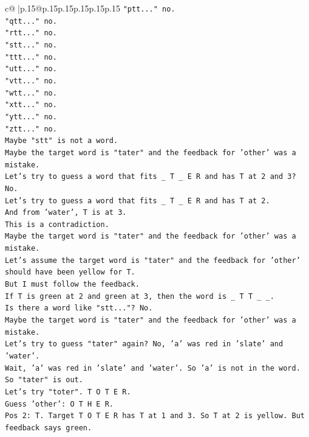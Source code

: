 \documentclass{article}
\begin{document}
{\begin{supertabular}{c@{$\;$}|p{.15\linewidth}@{}p{.15\linewidth}p{.15\linewidth}p{.15\linewidth}p{.15\linewidth}p{.15\linewidth}}
{{{\texttt{"ptt..." no.} \\
\texttt{"qtt..." no.} \\
\texttt{"rtt..." no.} \\
\texttt{"stt..." no.} \\
\texttt{"ttt..." no.} \\
\texttt{"utt..." no.} \\
\texttt{"vtt..." no.} \\
\texttt{"wtt..." no.} \\
\texttt{"xtt..." no.} \\
\texttt{"ytt..." no.} \\
\texttt{"ztt..." no.} \\
\texttt{Maybe "stt" is not a word.} \\
\texttt{Maybe the target word is "tater" and the feedback for 'other' was a mistake.} \\
\texttt{Let's try to guess a word that fits \_ T \_ E R and has T at 2 and 3? No.} \\
\texttt{Let's try to guess a word that fits \_ T \_ E R and has T at 2.} \\
\texttt{And from 'water', T is at 3.} \\
\texttt{This is a contradiction.} \\
\texttt{Maybe the target word is "tater" and the feedback for 'other' was a mistake.} \\
\texttt{Let's assume the target word is "tater" and the feedback for 'other' should have been yellow for T.} \\
\texttt{But I must follow the feedback.} \\
\texttt{If T is green at 2 and green at 3, then the word is \_ T T \_ \_.} \\
\texttt{Is there a word like "stt..."? No.} \\
\texttt{Maybe the target word is "tater" and the feedback for 'other' was a mistake.} \\
\texttt{Let's try to guess "tater" again? No, 'a' was red in 'slate' and 'water'.} \\
\texttt{Wait, 'a' was red in 'slate' and 'water'. So 'a' is not in the word.} \\
\texttt{So "tater" is out.} \\
\texttt{Let's try "toter". T O T E R.} \\
\texttt{Guess 'other': O T H E R.} \\
\texttt{Pos 2: T. Target T O T E R has T at 1 and 3. So T at 2 is yellow. But feedback says green.} \\
}}}
\end{supertabular}}
\end{document}
